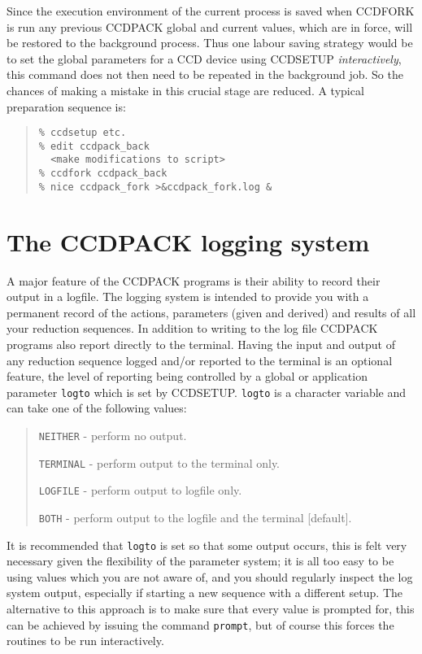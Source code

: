 \documentclass[twoside,11pt]{article}
\newcommand{\htmlref}[2]{#1}
\newcommand{\xlabel}[1]{}
\renewcommand{\_}{\texttt{\symbol{95}}}
\newenvironment{myquote}{\begin{quote}\begin{small}}{\end{small}\end{quote}}
\newcommand{\text}[1]{{\small \tt #1}}
\newcommand{\routine}[1]{{\sc #1}}
\newcommand{\xroutine}[1]{\htmlref{{\sc #1}}{#1}}
\begin{document}
Since the execution environment of the current process is saved
when \routine{CCDFORK} is run any previous CCDPACK global and current values,
which are in force, will be restored to the background process. Thus
one labour saving strategy would be to set the global parameters for a
CCD device using \routine{CCDSETUP} {\em interactively}, this command does not
then need to be repeated in the background job.  So the chances
of making a mistake in this crucial stage are reduced. A typical
preparation sequence is:
\begin{myquote}
\begin{verbatim}
% ccdsetup etc.
% edit ccdpack_back
  <make modifications to script>
% ccdfork ccdpack_back
% nice ccdpack_fork >&ccdpack_fork.log &
\end{verbatim}
\end{myquote}

\section{The CCDPACK logging system \xlabel{logsystem} \label{logsystem}}

A major feature of the CCDPACK programs is their ability to record
their output in a logfile. The logging
system is intended to provide you with a permanent record of the
actions, parameters (given and derived) and results of all your
reduction sequences. In addition to writing to the log file CCDPACK
programs also report directly to the terminal.  Having the input and output of
any reduction sequence logged and/or reported to the terminal is an
optional feature, the level of reporting being controlled by a global
or application parameter \text{logto} which is set by
\xroutine{CCDSETUP}. \text{logto} is a character variable and can take
one of the following values:
\begin{myquote}
\begin{description}
\item \text{NEITHER} - perform no output.
\item \text{TERMINAL} - perform output to the terminal only.
\item \text{LOGFILE} - perform output to logfile only.
\item \text{BOTH} - perform output to the logfile and the terminal [default].
\end{description}
\end{myquote}
It is recommended that \text{logto} is set so that some output
occurs, this is felt very necessary given the flexibility of the
parameter system; it is all too easy to be using values which you are
not aware of, and you should regularly inspect the log system output,
especially if starting a new sequence with a different setup. The
alternative to this approach is to make sure that every value is
prompted for, this can be achieved by issuing the command
\text{prompt}, but of course this forces the routines to be run
interactively.
\end{document}
